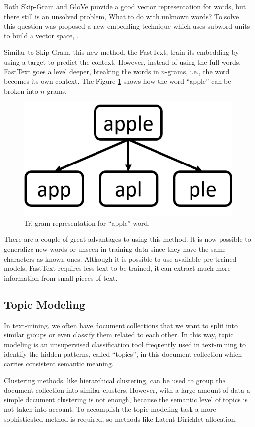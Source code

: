 	Both Skip-Gram and GloVe provide a good vector representation for words, but there still is an unsolved problem, What to do with unknown words? To solve this question was proposed a new embedding technique which uses subword units to build a vector space, \cite{bojanowski2017enriching}.
	
	Similar to Skip-Gram, this new method, the FastText, train its embedding by using a target to predict the context. However, instead of using the full words, FastText goes a level deeper, breaking the words in $n$-grams, i.e., the word becomes its own context. The Figure \ref{fig:apple-tri-gram} shows how the word ``apple'' can be broken into $n$-grams. 
		
	\begin{figure}[h!]
		\centering
		\includegraphics[width=0.4\linewidth]{01.Chapters/02.Background/apple-tri-gram}
		\caption{Tri-gram representation for ``apple'' word.}
		\label{fig:apple-tri-gram}
	\end{figure}
	
	There are a couple of great advantages to using this method. It is now possible to generalize new words or unseen in training data since they have the same characters as known ones. Although it is possible to use available pre-trained models, FastText requires less text to be trained, it can extract much more information from small pieces of text.	
	
	\subsection{Topic Modeling}
	
	In text-mining, we often have document collections that we want to split into similar groups or even classify them related to each other. In this way, topic modeling is an unsupervised classification tool frequently used in text-mining to identify the hidden patterns, called ``topics'', in this document collection which carries consistent semantic meaning.
	
	Clustering methods, like hierarchical clustering, can be used to group the document collection into similar clusters. However, with a large amount of data a simple document clustering is not enough, because the semantic level of topics is not taken into account. To accomplish the topic modeling task a more sophisticated method is required, so methods like Latent Dirichlet allocation.
	
